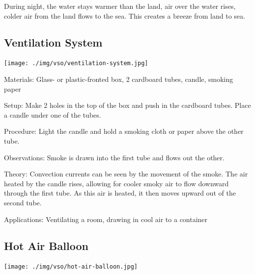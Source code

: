 \begin{multicols}{2}
\begin{description*}
{During night, the water stays warmer than the land, air over the water rises, colder air from the land flows to the sea. This creates a breeze from land to sea.}
\end{description*}

\columnbreak

\subsection{Ventilation System}

\begin{center}
\texttt{[image: ./img/vso/ventilation-system.jpg]}
\end{center}

\begin{description*}
\item[Materials:]{Glass- or plastic-fronted box, 2 cardboard tubes, candle, smoking paper}
\item[Setup:]{Make 2 holes in the top of the box and push in the cardboard tubes. Place a candle under one of the tubes.}
\item[Procedure:]{Light the candle and hold a smoking cloth or paper above the other tube.}
\item[Observations:]{Smoke is drawn into the first tube and flows out the other.}
\item[Theory:]{Convection currents can be seen by the movement of the smoke. The air heated by the candle rises, allowing for cooler smoky air to flow downward through the first tube. As this air is heated, it then moves upward out of the second tube.}
\item[Applications:]{Ventilating a room, drawing in cool air to a container}
\end{description*}

\subsection{Hot Air Balloon}

\begin{center}
\texttt{[image: ./img/vso/hot-air-balloon.jpg]}
\end{center}


\end{multicols}
